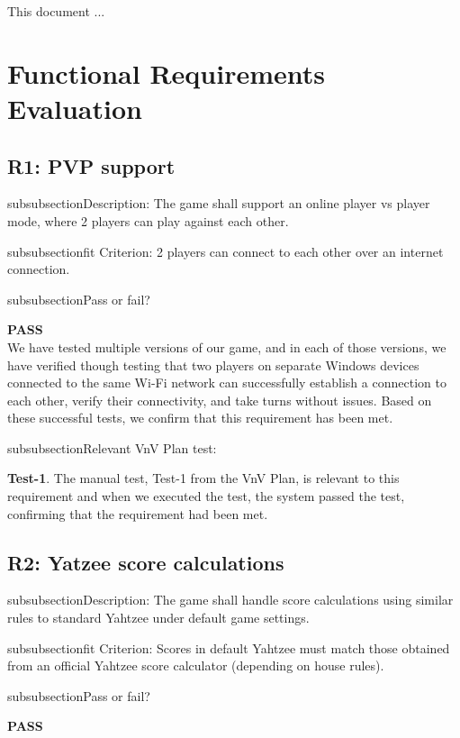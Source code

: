 \documentclass[12pt, titlepage]{article}
\begin{document}

This document ...

\section{Functional Requirements Evaluation}

\subsection{ R1: PVP support}

 \*subsubsection{Description:}  The game shall support an online player vs player mode, where 2 players can play against
each other.

 \*subsubsection{fit Criterion:}  2 players can connect to each other over an internet connection.
 
 \*subsubsection{Pass or fail?}
 
 \noindent \textbf{PASS}\\
 
 \noindent  We have tested multiple versions of our game, and in each of those versions, we have verified though testing that two players on separate Windows devices connected to the same Wi-Fi network can successfully establish a connection to each other, verify their connectivity, and take turns without issues. Based on these successful tests, we confirm that this requirement has been met.
 
 \*subsubsection{Relevant VnV Plan test: }  
 
  \noindent \textbf{ Test-1}. The manual test, Test-1 from the VnV Plan, is relevant to this requirement and when we executed the test, the system passed the test, confirming that the requirement had been met.

  
  \subsection{ R2: Yatzee score calculations} 
  
   \*subsubsection{Description:}  The game shall handle score calculations using similar rules to standard Yahtzee under default game settings.

 \*subsubsection{fit Criterion:}  Scores in default Yahtzee must match those obtained from an official Yahtzee score calculator (depending on house rules).
 
 \*subsubsection{Pass or fail?}
 
 \noindent \textbf{PASS}\\
 
\end{document}
